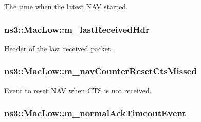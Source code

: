 The time when the latest N\+AV started. 

\subsubsection[{\texorpdfstring{m\+\_\+last\+Received\+Hdr}{m_lastReceivedHdr}}]{ ns3\+::\+Mac\+Low\+::m\+\_\+last\+Received\+Hdr\hspace{0.3cm}{\ttfamily [private]}}\hypertarget{classns3_1_1MacLow_aa085c0d48ba7c17138b8027666d85bb5}{}\label{classns3_1_1MacLow_aa085c0d48ba7c17138b8027666d85bb5}


\hyperlink{classns3_1_1Header}{Header} of the last received packet. 

\subsubsection[{\texorpdfstring{m\+\_\+nav\+Counter\+Reset\+Cts\+Missed}{m_navCounterResetCtsMissed}}]{ ns3\+::\+Mac\+Low\+::m\+\_\+nav\+Counter\+Reset\+Cts\+Missed\hspace{0.3cm}{\ttfamily [private]}}\hypertarget{classns3_1_1MacLow_a5aef4547e2a6ddad9c85d55bf77e43b1}{}\label{classns3_1_1MacLow_a5aef4547e2a6ddad9c85d55bf77e43b1}


Event to reset N\+AV when C\+TS is not received. 

\subsubsection[{\texorpdfstring{m\+\_\+normal\+Ack\+Timeout\+Event}{m_normalAckTimeoutEvent}}]{ ns3\+::\+Mac\+Low\+::m\+\_\+normal\+Ack\+Timeout\+Event\hspace{0.3cm}{\ttfamily [private]}}\hypertarget{classns3_1_1MacLow_a4376c10e5dc680bcdb50628540c8b412}{}\label{classns3_1_1MacLow_a4376c10e5dc680bcdb50628540c8b412}


